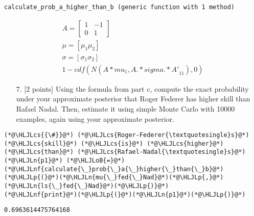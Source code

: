 \documentclass[12pt,a4paper]{article}
\newcommand{\HLJLn}[1]{#1}
\newcommand{\HLJLnf}[1]{\textcolor[RGB]{66,102,213}{#1}}
\newcommand{\HLJLoB}[1]{\textcolor[RGB]{102,102,102}{\textbf{#1}}}
\newcommand{\HLJLp}[1]{#1}
\newcommand{\HLJLcs}[1]{\textcolor[RGB]{153,153,119}{\textit{#1}}}
\begin{document}
\begin{lstlisting}
calculate_prob_a_higher_than_b (generic function with 1 method)
\end{lstlisting}



\begin{align}
A =
\begin{bmatrix}
1 & -1\\
0 & 1
\end{bmatrix}\\
\mu = [\mu_1 \mu_2]\\
\sigma = [\sigma_1 \sigma_2]\\
1 - cdf(N({A * mu}_1, {A .* sigma .* A'}_{11}), 0)
\end{align}
\begin{itemize}
\item[7. ] [2 points] Using the formula from part c, compute the exact probability under your approximate posterior that Roger Federer has higher skill than Rafael Nadal. Then, estimate it using simple Monte Carlo with 10000 examples, again using your approximate posterior.

\end{itemize}

\begin{lstlisting}
(*@\HLJLcs{{\#}}@*) (*@\HLJLcs{Roger-Federer{\textquotesingle}s}@*) (*@\HLJLcs{skill}@*) (*@\HLJLcs{is}@*) (*@\HLJLcs{higher}@*) (*@\HLJLcs{than}@*) (*@\HLJLcs{Rafael-Nadal{\textquotesingle}s}@*)
(*@\HLJLn{p1}@*) (*@\HLJLoB{=}@*) (*@\HLJLnf{calculate{\_}prob{\_}a{\_}higher{\_}than{\_}b}@*)(*@\HLJLp{(}@*)(*@\HLJLn{mu{\_}fed{\_}Nad}@*)(*@\HLJLp{,}@*) (*@\HLJLn{ls{\_}fed{\_}Nad}@*)(*@\HLJLp{)}@*)
(*@\HLJLnf{print}@*)(*@\HLJLp{(}@*)(*@\HLJLn{p1}@*)(*@\HLJLp{)}@*)
\end{lstlisting}

\begin{lstlisting}
0.6963614475764168
\end{lstlisting}
\end{document}
